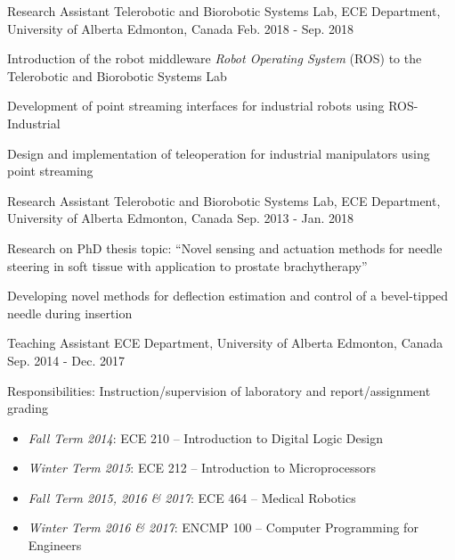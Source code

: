 \begin{cventries}
  \cventry
    {Research Assistant} %
    {Telerobotic and Biorobotic Systems Lab, ECE Department, University of Alberta} %
    {Edmonton, Canada} %
    {Feb. 2018 - Sep. 2018} %
    {
      \begin{cvitems}
        \item {Introduction of the robot middleware \emph{Robot Operating System} (ROS) to the Telerobotic and Biorobotic Systems Lab}
        \item {Development of point streaming interfaces for industrial robots using ROS-Industrial}
        \item {Design and implementation of teleoperation for industrial manipulators using point streaming}
      \end{cvitems}
    }

  \cventry
    {Research Assistant} %
    {Telerobotic and Biorobotic Systems Lab, ECE Department, University of Alberta} %
    {Edmonton, Canada} %
    {Sep. 2013 - Jan. 2018} %
    {
      \begin{cvitems} %
        \item{Research on PhD thesis topic: ``Novel sensing and actuation methods for needle steering in soft tissue with application to prostate brachytherapy''}
        \item{Developing novel methods for deflection estimation and control of a bevel-tipped needle during insertion}
      \end{cvitems}
    }

  \cventry
    {Teaching Assistant} %
    {ECE Department, University of Alberta} %
    {Edmonton, Canada} %
    {Sep. 2014 - Dec. 2017} %
    {
      \begin{cvitems}
        \item {Responsibilities: Instruction/supervision of laboratory and report/assignment grading}
        \begin{itemize}
          \item {\emph{Fall Term 2014}: ECE 210 -- Introduction to Digital Logic Design}
          \item {\emph{Winter Term 2015}: ECE 212 -- Introduction to Microprocessors}
          \item {\emph{Fall Term 2015, 2016 \& 2017}: ECE 464 -- Medical Robotics}
          \item {\emph{Winter Term 2016 \& 2017}: ENCMP 100 -- Computer Programming for Engineers}
        \end{itemize}
      \end{cvitems}
    }


\end{cventries}
